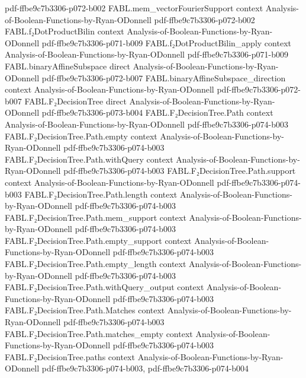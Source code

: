 \begin{theorem}
  {pdf-ffbe9c7b3306-p072-b002}
\proofstep
  {FABL.mem_vectorFourierSupport}
  {context}
  {Analysis-of-Boolean-Functions-by-Ryan-ODonnell}
  {pdf-ffbe9c7b3306-p072-b002}
\proofstep
  {FABL.f₂DotProductBilin}
  {context}
  {Analysis-of-Boolean-Functions-by-Ryan-ODonnell}
  {pdf-ffbe9c7b3306-p071-b009}
\proofstep
  {FABL.f₂DotProductBilin_apply}
  {context}
  {Analysis-of-Boolean-Functions-by-Ryan-ODonnell}
  {pdf-ffbe9c7b3306-p071-b009}
\proofstep
  {FABL.binaryAffineSubspace}
  {direct}
  {Analysis-of-Boolean-Functions-by-Ryan-ODonnell}
  {pdf-ffbe9c7b3306-p072-b007}
\proofstep
  {FABL.binaryAffineSubspace_direction}
  {context}
  {Analysis-of-Boolean-Functions-by-Ryan-ODonnell}
  {pdf-ffbe9c7b3306-p072-b007}
\proofstep
  {FABL.F₂DecisionTree}
  {direct}
  {Analysis-of-Boolean-Functions-by-Ryan-ODonnell}
  {pdf-ffbe9c7b3306-p073-b004}
\proofstep
  {FABL.F₂DecisionTree.Path}
  {context}
  {Analysis-of-Boolean-Functions-by-Ryan-ODonnell}
  {pdf-ffbe9c7b3306-p074-b003}
\proofstep
  {FABL.F₂DecisionTree.Path.empty}
  {context}
  {Analysis-of-Boolean-Functions-by-Ryan-ODonnell}
  {pdf-ffbe9c7b3306-p074-b003}
\proofstep
  {FABL.F₂DecisionTree.Path.withQuery}
  {context}
  {Analysis-of-Boolean-Functions-by-Ryan-ODonnell}
  {pdf-ffbe9c7b3306-p074-b003}
\proofstep
  {FABL.F₂DecisionTree.Path.support}
  {context}
  {Analysis-of-Boolean-Functions-by-Ryan-ODonnell}
  {pdf-ffbe9c7b3306-p074-b003}
\proofstep
  {FABL.F₂DecisionTree.Path.length}
  {context}
  {Analysis-of-Boolean-Functions-by-Ryan-ODonnell}
  {pdf-ffbe9c7b3306-p074-b003}
\proofstep
  {FABL.F₂DecisionTree.Path.mem_support}
  {context}
  {Analysis-of-Boolean-Functions-by-Ryan-ODonnell}
  {pdf-ffbe9c7b3306-p074-b003}
\proofstep
  {FABL.F₂DecisionTree.Path.empty_support}
  {context}
  {Analysis-of-Boolean-Functions-by-Ryan-ODonnell}
  {pdf-ffbe9c7b3306-p074-b003}
\proofstep
  {FABL.F₂DecisionTree.Path.empty_length}
  {context}
  {Analysis-of-Boolean-Functions-by-Ryan-ODonnell}
  {pdf-ffbe9c7b3306-p074-b003}
\proofstep
  {FABL.F₂DecisionTree.Path.withQuery_output}
  {context}
  {Analysis-of-Boolean-Functions-by-Ryan-ODonnell}
  {pdf-ffbe9c7b3306-p074-b003}
\proofstep
  {FABL.F₂DecisionTree.Path.Matches}
  {context}
  {Analysis-of-Boolean-Functions-by-Ryan-ODonnell}
  {pdf-ffbe9c7b3306-p074-b003}
\proofstep
  {FABL.F₂DecisionTree.Path.matches_empty}
  {context}
  {Analysis-of-Boolean-Functions-by-Ryan-ODonnell}
  {pdf-ffbe9c7b3306-p074-b003}
\proofstep
  {FABL.F₂DecisionTree.paths}
  {context}
  {Analysis-of-Boolean-Functions-by-Ryan-ODonnell}
  {pdf-ffbe9c7b3306-p074-b003,
    pdf-ffbe9c7b3306-p074-b004}
\proofstep

\end{theorem}
